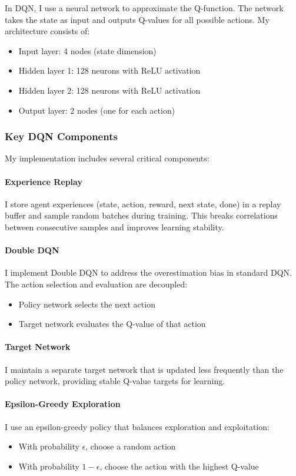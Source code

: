 \documentclass[11pt,a4paper]{article}
\begin{document}
In DQN, I use a neural network to approximate the Q-function. The network takes the state as input and outputs Q-values for all possible actions. My architecture consists of:

\begin{itemize}
    \item Input layer: 4 nodes (state dimension)
    \item Hidden layer 1: 128 neurons with ReLU activation
    \item Hidden layer 2: 128 neurons with ReLU activation 
    \item Output layer: 2 nodes (one for each action)
\end{itemize}

\subsubsection{Key DQN Components}

My implementation includes several critical components:

\paragraph{Experience Replay} I store agent experiences (state, action, reward, next state, done) in a replay buffer and sample random batches during training. This breaks correlations between consecutive samples and improves learning stability.

\paragraph{Double DQN} I implement Double DQN to address the overestimation bias in standard DQN. The action selection and evaluation are decoupled:
\begin{itemize}
    \item Policy network selects the next action
    \item Target network evaluates the Q-value of that action
\end{itemize}

\paragraph{Target Network} I maintain a separate target network that is updated less frequently than the policy network, providing stable Q-value targets for learning.

\paragraph{Epsilon-Greedy Exploration} I use an epsilon-greedy policy that balances exploration and exploitation:
\begin{itemize}
    \item With probability $\epsilon$, choose a random action
    \item With probability $1-\epsilon$, choose the action with the highest Q-value
\end{itemize}
\end{document}
